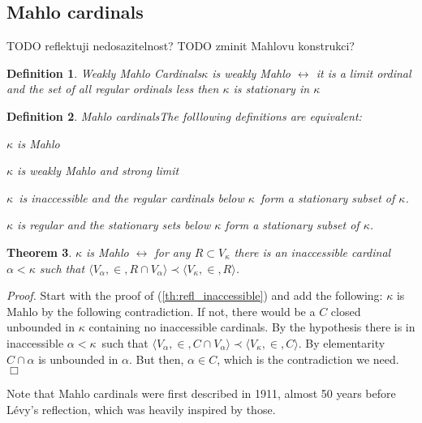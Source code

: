 \documentclass[12pt,a4paper]{article}
\newtheorem{theorem}{Theorem}[section]
\newtheorem{definition}[theorem]{Definition}
\newenvironment{proof}
{\noindent \textit{Proof.}}
{\hspace*{\fill} $\Box$}
\renewcommand{\iff}{\leftrightarrow}
\newcommand{\bce}{\begin{compactenum}}
\newcommand{\ece}{\end{compactenum}}
\begin{document}
%
%
\subsection{Mahlo cardinals}
TODO reflektuji nedosazitelnost?
TODO zminit Mahlovu konstrukci?

\begin{definition}{Weakly Mahlo Cardinals}\label{def:weakly_mahlo}
$\kappa$ is \emph{weakly Mahlo} $\iff$ it is a limit ordinal and the set of all regular ordinals less then $\kappa$ is stationary in $\kappa$
\end{definition}

\begin{definition}{Mahlo cardinals}\label{def:mahlo}
The folllowing definitions are equivalent:
\bce[(i)]
\item $\kappa$ is Mahlo
\item $\kappa$ is weakly Mahlo and strong limit
\item $\kappa$ is inaccessible and the regular cardinals below $\kappa$ form a stationary subset of $\kappa$.
\item $\kappa$ is regular and the stationary sets below $\kappa$ form a stationary subset of $\kappa$.
\ece
\end{definition}

\begin{theorem}\label{th:refl_mahlo}
$\kappa$ is Mahlo $\iff$ for any $R \subset V_\kappa$ there is an inaccessible cardinal $\alpha < \kappa$ such that $\langle V_\alpha, \in, R \cap V_\alpha \rangle \prec \langle V_\kappa, \in, R \rangle$.
\end{theorem}

\begin{proof}
Start with the proof of (\ref{th:refl_inaccessible}) and add the following:\newline
$\kappa$ is Mahlo by the following contradiction. If not, there would be a $C$ closed unbounded in $\kappa$ containing no inaccessible cardinals. By the hypothesis there is in inaccessible $\alpha < \kappa$ such that $\langle V_\alpha, \in, C \cap V_\alpha \rangle \prec \langle V_\kappa, \in, C \rangle$. By elementarity $C \cap \alpha$ is unbounded in $\alpha$. But then, $\alpha \in C$, which is the contradiction we need.
\end{proof}

Note that Mahlo cardinals were first described in 1911, almost 50 years before Lévy's reflection, which was heavily inspired by those. %
\end{document}
